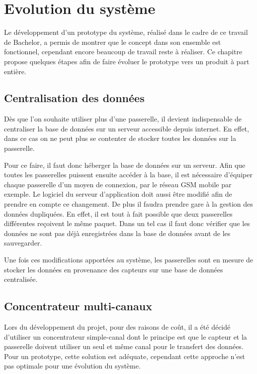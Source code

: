 
\chapter{Evolution du système}\label{ch:produit}

Le développement d'un prototype du système, réalisé dans le cadre de ce travail de Bachelor, a permis de montrer que le concept dans son ensemble est fonctionnel, cependant encore beaucoup de travail reste à réaliser. Ce chapitre propose quelques étapes afin de faire évoluer le prototype vers un produit à part entière.

\section{Centralisation des données}

Dès que l'on souhaite utiliser plus d'une passerelle, il devient indispensable de centraliser la base de données sur un serveur accessible depuis internet. En effet, dans ce cas on ne peut plus se contenter de stocker toutes les données sur la passerelle.

Pour ce faire, il faut donc héberger la base de données sur un serveur. Afin que toutes les passerelles puissent ensuite accéder à la base, il est nécessaire d'équiper chaque passerelle d'un moyen de connexion, par le réseau GSM mobile par exemple. Le logiciel du serveur d'application doit aussi être modifié afin de prendre en compte ce changement. De plus il faudra prendre gare à la gestion des données dupliquées. En effet, il est tout à fait possible que deux passerelles différentes reçoivent le même paquet. Dans un tel cas il faut donc vérifier que les données ne sont pas déjà enregistrées dans la base de données avant de les sauvegarder.

Une fois ces modifications apportées au système, les passerelles sont en mesure de stocker les données en provenance des capteurs sur une base de données centralisée.

\section{Concentrateur multi-canaux}

Lors du développement du projet, pour des raisons de coût, il a été décidé d'utiliser un concentrateur simple-canal dont le principe est que le capteur et la passerelle doivent utiliser un seul et même canal pour le transfert des données. Pour un prototype, cette solution est adéquate, cependant cette approche n'est pas optimale pour une évolution du système.

